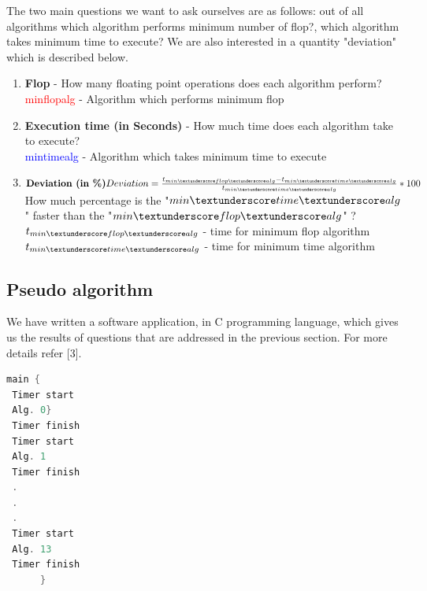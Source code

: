 \documentclass[10pts]{article}
\begin{document}
The two main questions we want to ask ourselves are as follows: out of all algorithms which algorithm performs minimum number of flop?, which algorithm takes minimum time to execute? We are also interested in a quantity "deviation" which is described below. 


	\begin{enumerate}[(\roman{*})]
		\item \textbf{Flop} - How many floating point operations does each algorithm perform? \\
    	\textcolor{red}{min\textunderscore flop\textunderscore alg}   - Algorithm which performs minimum flop\\
		\item \textbf{Execution time (in Seconds)} - How much time does each algorithm take to execute?\\
		\textcolor{blue}{min\textunderscore time\textunderscore alg}   - Algorithm which takes minimum time to execute\\
		\item $\textbf{Deviation (in \%)}\\
		Deviation =\frac{t_{min \textunderscore flop \textunderscore alg}-t_{min\textunderscore time \textunderscore alg}}{t_{min \textunderscore time \textunderscore alg}} *100$ \\
		How much percentage is the "$min\textunderscore time\textunderscore alg$" faster than the "$min\textunderscore flop\textunderscore alg$" ? \\
     	\textcolor{red}{$t_{min \textunderscore flop \textunderscore alg}$} - time for minimum flop algorithm\\
		\textcolor{blue}{$t_{min\textunderscore time \textunderscore alg}$}  -  time for minimum time algorithm
	\end{enumerate}


\subsection*{Pseudo algorithm}
We have written a software application, in C programming language, which gives us the results of questions that are addressed in the previous section. For more details refer [3].


\begin{center}
 \begin{lstlisting}[language=c++]
 main { 
 Timer start
 Alg. 0}
 Timer finish
 Timer start
 Alg. 1
 Timer finish
 .
 .
 . 				 
 Timer start
 Alg. 13
 Timer finish
      }
 \end{lstlisting}
\end{center}
\end{document}
